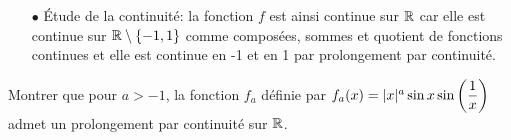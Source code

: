 \documentclass[a4paper, 11pt,reqno]{article}
\begin{document}
\begin{correction}
\begin{itemize}
\begin{itemize}
			      \item[$\star$] Limite en 1: on reconna\^{i}t par exemple le quotient de deux taux d'accroissement:
			            $f(x)=\ddp\frac{e^{x^2}-e}{x-1}\times \ddp\frac{x-1}{x^{2n}-1}$. La fonction $g: x\mapsto e^{x^2}$ est bien d\'erivable en -1 car elle est d\'erivable sur $\R$ comme compos\'ee de fonctions d\'erivables et on a: $g^{\prime}(-1)=-2e$. La fonction $h: x\mapsto x^{2n}$ est bien d\'erivable en -1 car elle est d\'erivable sur $\R$ comme fonction polynomiale et on a: $h^{\prime}(1)=-2n$ car $h^{\prime}(x)=2nx^{2n-1}$ et $2n-1\geq 1$ car $n\geq 1$. Ainsi d'apr\`{e}s le taux d'accroissement, on obtient que: $\lim\limits_{x\to -1} f(x)=\ddp\frac{g^{\prime}(-1)}{h^{\prime}(-1)}=\ddp\frac{e}{n}$. Ainsi la fonction $f$ est prolongeable par continuit\'e en -1 en posant $f(-1)=\ddp\frac{e}{n}$. On obtient alors une nouvelle fonction que l'on continue de noter $f$ qui est d\'efinie sur $\R$ par
			            $f(x)=\left\lbrace \begin{array}{ll} \ddp\frac{e^{x^2}-e}{x^{2n}-1}& \hbox{si}\ x\notin \lbrace -1,1\rbrace,\vsec\\ \ddp\frac{e}{n} & \hbox{si}\ x=1 \hbox{ ou }\ x=-1.\end{array}\right.$
		      \end{itemize}
		\item[$\bullet$] \'Etude de la continuit\'e: la fonction $f$ est ainsi continue sur $\R$ car elle est continue sur $\mathbb{R}\setminus\lbrace -1,1\rbrace$ comme compos\'ees, sommes et quotient de fonctions continues et elle est continue en -1 et en 1 par prolongement par continuit\'e.
	\end{itemize}
\end{correction}
\begin{exercice}   \;
	Montrer que pour $a>-1$, la fonction $f_a$ d\'efinie par $f_a(x)=|x|^a\sin{x}\sin{\left( \displaystyle\frac{1}{x}\right)}$
	admet un prolongement par continuit\'e sur $\R$.
\end{exercice}
\end{document}
